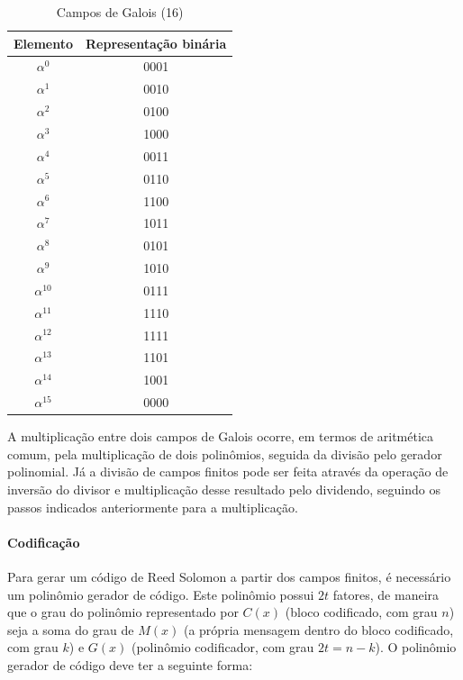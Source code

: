 	\begin{table}[]
		\centering
		\caption{Campos de Galois (16)}
		\label{my-label}
		\begin{tabular}{|c|c|}
			\hline
			Elemento & Representação binária \\ \hline
			$\alpha^{0}$   & 0001                  \\ \hline
			$\alpha^{1}$   & 0010                  \\ \hline
			$\alpha^{2}$   & 0100                  \\ \hline
			$\alpha^{3}$   & 1000                  \\ \hline
			$\alpha^{4}$   & 0011                  \\ \hline
			$\alpha^{5}$   & 0110                  \\ \hline
			$\alpha^{6}$   & 1100                  \\ \hline
			$\alpha^{7}$   & 1011                  \\ \hline
			$\alpha^{8}$   & 0101                  \\ \hline
			$\alpha^{9}$   & 1010                  \\ \hline
			$\alpha^{10}$  & 0111                  \\ \hline
			$\alpha^{11}$  & 1110                  \\ \hline
			$\alpha^{12}$  & 1111                  \\ \hline
			$\alpha^{13}$  & 1101                  \\ \hline
			$\alpha^{14}$  & 1001                  \\ \hline
			$\alpha^{15}$  & 0000                  \\ \hline
		\end{tabular}
	\end{table}
	 
	A multiplicação entre dois campos de Galois ocorre, em termos de aritmética comum, pela multiplicação de dois polinômios, seguida da divisão pelo gerador polinomial. Já a divisão  de campos finitos pode ser feita através da operação de inversão do divisor e multiplicação desse resultado pelo dividendo, seguindo os passos indicados anteriormente para a multiplicação. 
	 
	\paragraph{Codificação}
	 
	Para gerar um código de Reed Solomon a partir dos campos finitos, é necessário um polinômio gerador de código. Este polinômio possui $2t$ fatores, de maneira que o grau do polinômio representado por $C(x)$ (bloco codificado, com grau $n$) seja a soma do grau de $M(x)$ (a própria mensagem dentro do bloco codificado, com grau $k$) e $G(x)$ (polinômio codificador, com grau $2t = n - k$). O polinômio gerador de código deve ter a seguinte forma:
	 
